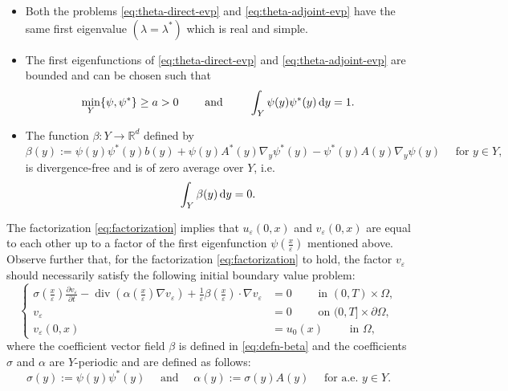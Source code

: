 \documentclass[preprint, 12pt]{amsart}
\numberwithin{equation}{section}
\numberwithin{equation}{section}
\newcommand{\eps}{\varepsilon}
\begin{document}
\begin{itemize}
\item Both the problems \eqref{eq:theta-direct-evp} and \eqref{eq:theta-adjoint-evp} have the same first eigenvalue $(\lambda=\lambda^\ast)$ which is real and simple.
\item The first eigenfunctions of \eqref{eq:theta-direct-evp} and \eqref{eq:theta-adjoint-evp} are bounded and can be chosen such that
\begin{equation}\label{eq:eigenfn-normalisation}
\min_Y\{\psi, \psi^\ast\} \ge a > 0
\qquad
\mbox{ and }
\qquad 
\int_Y \psi(y) \psi^\ast(y)\, {\rm d}y = 1.
\end{equation}
\item The function $\beta:Y\to\mathbb{R}^d$ defined by
\begin{equation}\label{eq:defn-beta}
\beta(y) := \psi(y)\psi^\ast(y)b(y) + \psi(y)A^\ast(y)\nabla_y \psi^\ast(y) - \psi^\ast(y)A(y)\nabla_y \psi(y) \quad \mbox{ for }y\in Y,
\end{equation}
is divergence-free and is of zero average over $Y$, i.e.
\[
\int_Y \beta(y)\, {\rm d}y = 0.
\]
\end{itemize}
The factorization \eqref{eq:factorization} implies that $u_\eps(0,x)$ and $v_\eps(0,x)$ are equal to each other up to a factor of the first eigenfunction $\psi\left(\frac{x}{\eps}\right)$ mentioned above. Observe further that, for the factorization \eqref{eq:factorization} to hold, the factor $v_\varepsilon$ should necessarily satisfy the following initial boundary value problem:
\begin{equation}\label{equation for v-eps}
\left\{
\begin{aligned}
\sigma\left(\frac{x}{\varepsilon}\right)\frac{\partial v_{\varepsilon}}{\partial t} -\operatorname{div}\left(\alpha\left(\frac{x}{\varepsilon}\right)\nabla v_{\varepsilon}\right) + \frac{1}{\varepsilon}\beta\left(\frac{x}{\varepsilon} \right)\cdot\nabla v_{\varepsilon}  & =  0 \qquad \mbox{ in }(0,T)\times \Omega,
\\
v_{\varepsilon}&=0 \qquad \mbox{ on } (0,T]\times \partial \Omega,
\\
v_{\varepsilon}(0,x)&=u_0(x)\qquad \mbox{ in } \Omega,
\end{aligned}
\right.
\end{equation}
where the coefficient vector field $\beta$ is defined in \eqref{eq:defn-beta} and the coefficients $\sigma$ and $\alpha$ are $Y$-periodic and are defined as follows:
\begin{equation}
\sigma(y) := \psi(y)\psi^\ast(y)
\quad
\mbox{ and }
\quad
\alpha(y) := \sigma(y) A(y) 
\quad
\mbox{ for a.e. }y\in Y.
\end{equation}
\end{document}
